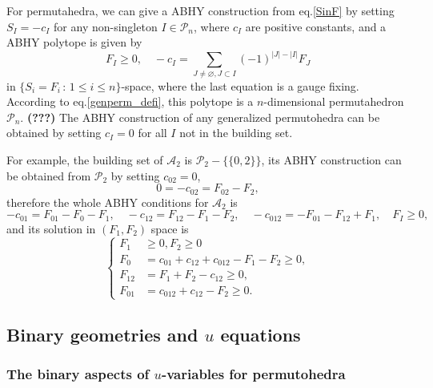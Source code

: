 \documentclass[hidelinks,12pt]{article}
\begin{document}
For permutahedra, we can give a ABHY construction from eq.\eqref{SinF} by setting 
$S_I=-c_I$ for any non-singleton $I\in \mathscr P_n$, where $c_I$ are positive 
constants, and a ABHY polytope is given by 
\begin{equation}\label{ABHY}
	F_I\geq 0,\quad -c_I=\sum_{J\neq \varnothing,J\subset I}(-1)^{|J|-|I|}F_J
\end{equation}
in $\{S_i=F_i\,:\,1\leq i\leq n\}$-space, where the last equation is a gauge fixing. 
According to eq.\eqref{genperm_defi}, this polytope is a $n$-dimensional 
permutahedron $\mathscr P_n$. {\bf (???)}
The ABHY construction of any generalized permutohedra can be obtained by 
setting $c_I=0$ for all $I$ not in the building set.

For example, the building set of $\mathscr A_2$ is $\mathscr P_2-\{\{0,2\}\}$,
its ABHY construction can be obtained from $\mathscr P_2$ by setting $c_{02}=0$, 
\[
	0=-c_{02}=F_{02}-F_2,
\]
therefore the whole ABHY conditions for $\mathscr A_2$ is 
\[
	-c_{01}=F_{01}-F_0-F_1,\quad -c_{12}=F_{12}-F_1-F_2,\quad 
	-c_{012}=-F_{01}-F_{12}+F_1,\quad F_I\geq 0,
\]
and its solution in $(F_1,F_2)$ space is 
\[
	\left\{\begin{aligned}
		F_1&\geq 0,F_2\geq 0\\
		F_0&=c_{01}+c_{12}+c_{012}-F_1-F_2\geq 0,\\
		F_{12}&=F_1+F_2-c_{12}\geq 0,\\
		F_{01}&=c_{012}+c_{12}-F_2\geq 0.
	\end{aligned}\right.
\]

\subsection{Binary geometries and $u$ equations}


\subsubsection{The binary aspects of $u$-variables for permutohedra}
\end{document}
